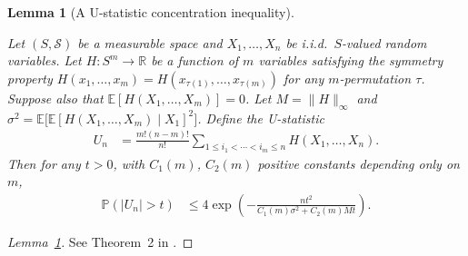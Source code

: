 \documentclass[11pt,lof]{puthesis}
\renewcommand{\P}{\ensuremath{\mathbb{P}}}
\newcommand{\R}{\ensuremath{\mathbb{R}}}
\newcommand{\E}{\ensuremath{\mathbb{E}}}
\newcommand{\cS}{\ensuremath{\mathcal{S}}}
\theoremstyle{break}
\newtheorem{lemma}{Lemma}[section]
\theoremstyle{proof}
\newtheorem{proof}{Proof}
\begin{document}
\begin{lemma}[A U-statistic concentration inequality]
  \label{lem:kernel_app_ustat_concentration}

  Let $(S,\cS)$ be a measurable space and
  $X_1, \ldots, X_n$ be i.i.d.\ $S$-valued random variables.
  Let $H: S^m \to \R$ be a function of $m$ variables
  satisfying the symmetry property
  $H(x_1, \ldots, x_m) = H(x_{\tau (1)}, \ldots, x_{\tau (m)})$
  for any $m$-permutation $\tau$.
  Suppose also that
  $\E[H(X_1, \ldots, X_m)] = 0$.
  Let
  $M = \|H\|_\infty$
  and
  $\sigma^2 = \E\big[\E[H(X_1, \ldots, X_m) \mid X_1]^2\big]$.
  Define the U-statistic
  \begin{align*}
    U_n
    &=
    \frac{m!(n-m)!}{n!}
    \sum_{1 \leq i_1 < \cdots < i_m \leq n}
    H(X_1, \ldots, X_n).
  \end{align*}
  Then for any $t > 0$,
  with $C_1(m)$, $C_2(m)$
  positive constants depending only on $m$,
  \begin{align*}
    \P\left(
      |U_n| > t
    \right)
    &\leq
    4 \exp \left(
      - \frac{n t^2}{C_1(m) \sigma^2 + C_2(m) M t}
    \right).
  \end{align*}
\end{lemma}

\begin{proof}[Lemma~\ref{lem:kernel_app_ustat_concentration}]
  See Theorem~2 in \citet{arcones1995bernstein}.
\end{proof}
\end{document}
